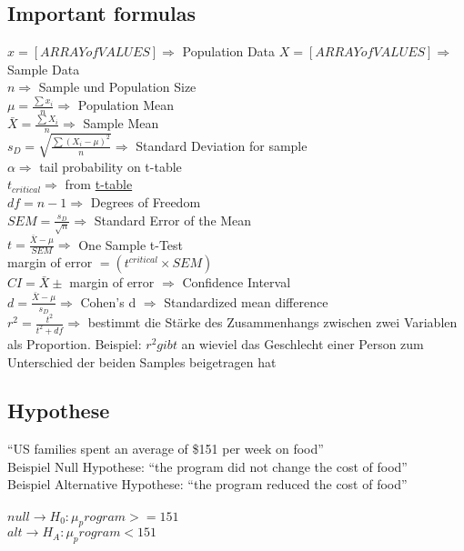 \documentclass[landscape]{article}
\begin{document}
		\subsection{Important formulas}
			\(x = [ARRAY of VALUES] \Rightarrow\) Population Data
			\(X = [ARRAY of VALUES] \Rightarrow\) Sample Data
			\\\(n \Rightarrow\) Sample und Population Size
			\\\(\mu = \frac{\sum{x_i}}{n}\Rightarrow\) Population Mean
			\\\(\bar{X} = \frac{\sum{X_i}}{n} \Rightarrow\) Sample Mean
			\\\(s_D = \sqrt{\frac{\sum{(X_i - \mu)^2}}{n}} \Rightarrow\) Standard Deviation for sample
			\\\(\alpha \Rightarrow\) tail probability on t-table
			\\\(t_{critical} \Rightarrow\) from \href{https://s3.amazonaws.com/udacity-hosted-downloads/t-table.jpg}{t-table}
			\\\(df = n - 1 \Rightarrow\) Degrees of Freedom
			\\\(SEM = \frac{s_D}{\sqrt{n}} \Rightarrow\) Standard Error of the Mean
			\\\(t = \frac{\bar{X} - \mu}{SEM} \Rightarrow\) One Sample t-Test
			\\margin of error \(= (t^{critical} \times SEM)\)
			\\\(CI = \bar{X} \pm \) margin of error \(\Rightarrow\) Confidence Interval
			\\\(d = \frac{\bar{X}-\mu}{s_D} \Rightarrow\) Cohen's d \(\Rightarrow\) Standardized mean difference 
			\\\(r^2 = \frac{t^2}{t^2 + df} \Rightarrow\) bestimmt die Stärke des Zusammenhangs zwischen zwei Variablen als Proportion. Beispiel: \(r^2 gibt\) an wieviel das Geschlecht einer Person zum Unterschied der beiden Samples beigetragen hat

		\subsection{Hypothese}
			``US families spent an average of \$151 per week on food''
			\\Beispiel Null Hypothese: ``the program did not change the cost of food''
			\\Beispiel Alternative Hypothese: ``the program reduced the cost of food''
			\\
			\\\(null \rightarrow H_0:\mu_program >= 151\)
			\\\(alt \rightarrow H_A:\mu_program < 151\)
\end{document}
